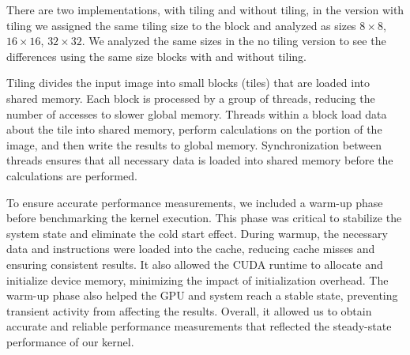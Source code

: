\documentclass[a4paper]{article}
\newcommand{\highspace}{\vspace{1.2em}\noindent}
\begin{document}
    \highspace
    There are two implementations, with tiling and without tiling, in the version with tiling we assigned the same tiling size to the block and analyzed as sizes $8 \times 8$, $16 \times 16$, $32 \times 32$.
    We analyzed the same sizes in the no tiling version to see the differences using the same size blocks with and without tiling.

    \highspace
    Tiling divides the input image into small blocks (tiles) that are loaded into shared memory. Each block is processed by a group of threads, reducing the number of accesses to slower global memory. Threads within a block load data about the tile into shared memory, perform calculations on the portion of the image, and then write the results to global memory. Synchronization between threads ensures that all necessary data is loaded into shared memory before the calculations are performed.

    \highspace
    To ensure accurate performance measurements, we included a warm-up phase before benchmarking the kernel execution. This phase was critical to stabilize the system state and eliminate the cold start effect. During warmup, the necessary data and instructions were loaded into the cache, reducing cache misses and ensuring consistent results. It also allowed the CUDA runtime to allocate and initialize device memory, minimizing the impact of initialization overhead. The warm-up phase also helped the GPU and system reach a stable state, preventing transient activity from affecting the results. Overall, it allowed us to obtain accurate and reliable performance measurements that reflected the steady-state performance of our kernel.
\end{document}
